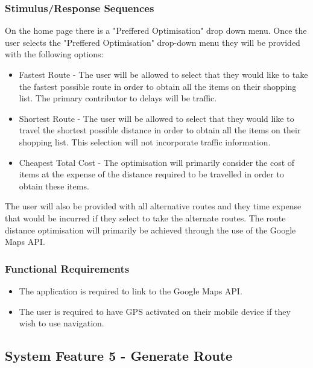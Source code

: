\documentclass[10pt, a4paper, onecolumn]{scrartcl}
\begin{document}
			\subsubsection{Stimulus/Response Sequences}
			
				On the home page there is a "Preffered Optimisation" drop down menu. Once the user selects the "Preffered Optimisation" drop-down menu they will be provided with the following options:
				
				\begin{itemize}
					\item Fastest Route - The user will be allowed to select that they would like to take the fastest possible route in order to obtain all the items on their shopping list. The primary contributor to delays will be traffic.
					\item Shortest Route - The user will be allowed to select that they would like to travel the shortest possible distance in order to obtain all the items on their shopping list. This selection will not incorporate traffic information.
					\item Cheapest Total Cost - The optimisation will primarily consider the cost of items at the expense of the distance required to be travelled in order to obtain these items. 
				\end{itemize}
				
				The user will also be provided with all alternative routes and they time expense that would be incurred if they select to take the alternate routes. The route distance optimisation will primarily be achieved through the use of the Google Maps API.
			
			\subsubsection{Functional Requirements}
			
				\begin{itemize}
					\item The application is required to link to the Google Maps API.
					\item The user is required to have GPS activated on their mobile device if they wish to use navigation.
				\end{itemize}
		
		\subsection{System Feature 5 - Generate Route}
		
\end{document}
